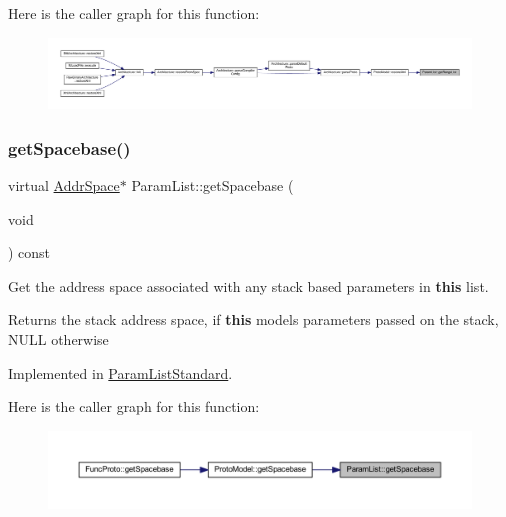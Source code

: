 Here is the caller graph for this function\+:
\nopagebreak
\begin{figure}[H]
\begin{center}
\leavevmode
\includegraphics[width=350pt]{class_param_list_a35f41fbd1143cba10bd81cd5a81ad476_icgraph}
\end{center}
\end{figure}
\mbox{\label{class_param_list_ae42fc70d73e1143e5dad67766e413f05}} 
\subsubsection{\texorpdfstring{getSpacebase()}{getSpacebase()}}
{\footnotesize\ttfamily virtual \mbox{\hyperlink{class_addr_space}{Addr\+Space}}$\ast$ Param\+List\+::get\+Spacebase (\begin{DoxyParamCaption}\item[{void}]{ }\end{DoxyParamCaption}) const\hspace{0.3cm}{\ttfamily [pure virtual]}}



Get the address space associated with any stack based parameters in {\bfseries{this}} list. 

\begin{DoxyReturn}{Returns}
the stack address space, if {\bfseries{this}} models parameters passed on the stack, N\+U\+LL otherwise 
\end{DoxyReturn}


Implemented in \mbox{\hyperlink{class_param_list_standard_a8c6910cf8fb253c2f64361dbf92901c5}{Param\+List\+Standard}}.

Here is the caller graph for this function\+:
\nopagebreak
\begin{figure}[H]
\begin{center}
\leavevmode
\includegraphics[width=350pt]{class_param_list_ae42fc70d73e1143e5dad67766e413f05_icgraph}
\end{center}
\end{figure}
\mbox{\label{class_param_list_a9e3de5eb123af1ab9122de9f32e63859}} 
